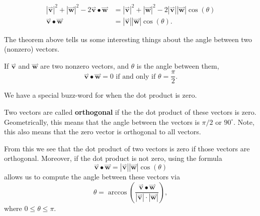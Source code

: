 \documentclass{ximera}
\begin{document}
\begin{theorem}
\begin{explanation}
\begin{align*}
      |\overset{\boldsymbol{\rightharpoonup}}{\mathbf{v}}|^2+|\overset{\boldsymbol{\rightharpoonup}}{\mathbf{w}}|^2 -2\overset{\boldsymbol{\rightharpoonup}}{\mathbf{v}}\bullet\overset{\boldsymbol{\rightharpoonup}}{\mathbf{w}} &=|\overset{\boldsymbol{\rightharpoonup}}{\mathbf{v}}|^2+|\overset{\boldsymbol{\rightharpoonup}}{\mathbf{w}}|^2-2|\overset{\boldsymbol{\rightharpoonup}}{\mathbf{v}}||\overset{\boldsymbol{\rightharpoonup}}{\mathbf{w}}|\cos(\theta)\\
      \overset{\boldsymbol{\rightharpoonup}}{\mathbf{v}} \bullet \overset{\boldsymbol{\rightharpoonup}}{\mathbf{w}} &= |\overset{\boldsymbol{\rightharpoonup}}{\mathbf{v}}||\overset{\boldsymbol{\rightharpoonup}}{\mathbf{w}}|\cos(\theta).
    \end{align*}
  \end{explanation}
\end{theorem}

The theorem above tells us some interesting things about the angle 
between two (nonzero) vectors.

\begin{theorem}
  If $\overset{\boldsymbol{\rightharpoonup}}{\mathbf{v}}$ and $\overset{\boldsymbol{\rightharpoonup}}{\mathbf{w}}$ are two nonzero vectors, and $\theta$ is
  the angle between them,
  \[
  \overset{\boldsymbol{\rightharpoonup}}{\mathbf{v}}\bullet \overset{\boldsymbol{\rightharpoonup}}{\mathbf{w}} = 0 \text{ if and only if } \theta=
  \frac{\pi}{2}.
  \]
\end{theorem}

We have a special buzz-word for when the dot product is zero.

\begin{definition}
  Two vectors are called \textbf{orthogonal} if the the dot product of
  these vectors is zero. Geometrically, this means that the angle
  between the vectors is $\pi/2$ or $90^\circ$. Note, this also means
  that the zero vector is orthogonal to all vectors.
\end{definition}

From this we see that the dot product of two vectors is zero if those
vectors are orthogonal.  Moreover, if the dot product is not zero,
using the formula
\[
\overset{\boldsymbol{\rightharpoonup}}{\mathbf{v}} \bullet \overset{\boldsymbol{\rightharpoonup}}{\mathbf{w}} = |\overset{\boldsymbol{\rightharpoonup}}{\mathbf{v}}||\overset{\boldsymbol{\rightharpoonup}}{\mathbf{w}}|\cos(\theta)
\]
allows us to compute the angle between these vectors via
\[
\theta = \arccos\left(\frac{\overset{\boldsymbol{\rightharpoonup}}{\mathbf{v}} \bullet \overset{\boldsymbol{\rightharpoonup}}{\mathbf{w}}
}{|\overset{\boldsymbol{\rightharpoonup}}{\mathbf{v}}|\cdot|\overset{\boldsymbol{\rightharpoonup}}{\mathbf{w}}|}\right),
\]
where $0\le \theta\le \pi$.
\end{document}
